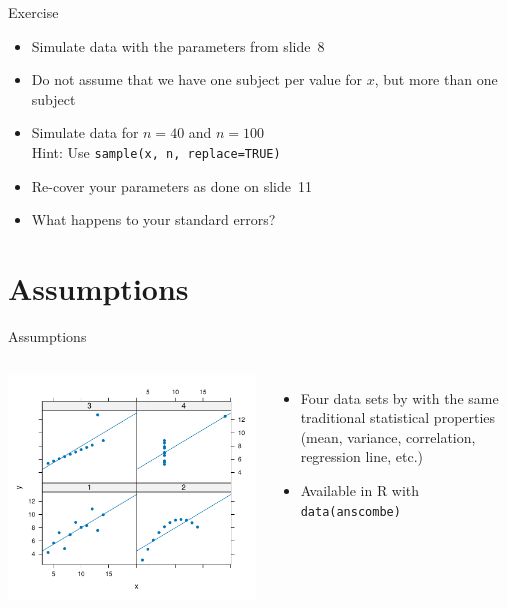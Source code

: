 \documentclass[aspectratio=169]{beamer}
\begin{document}
\begin{frame}{}
  \begin{block}{Exercise}
    \begin{itemize}
      \item Simulate data with the parameters from slide~8
      \item Do not assume that we have one subject per value for $x$, but
        more than one subject
      \item Simulate data for $n=40$ and $n=100$\\
        Hint: Use \texttt{sample(x, n, replace=TRUE)}
      \item Re-cover your parameters as done on slide~11
      \item What happens to your standard errors?
    \end{itemize}
  \end{block}
\end{frame}

\section{Assumptions}

\begin{frame}{Assumptions}
  \begin{columns}
    \includegraphics[scale=.61]{../figures/anscombe} 
  \begin{itemize}
    \item Four data sets by \citet{Anscombe1973} with the same traditional
      statistical properties (mean, variance, correlation, regression line,
      etc.)
    \item Available in R with \texttt{data(anscombe)}
  \end{itemize}
  \end{columns}
\end{frame}
\end{document}
